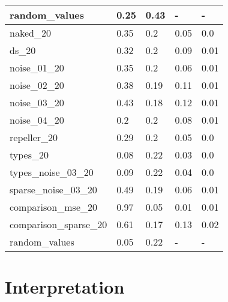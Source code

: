 \begin{table}[!htb]
\begin{tabularx}{\textwidth}{p{5cm} X X X X}
		random\_values & 0.25 & 0.43 & - & - \\
		\hline
		naked\_20 & 0.35 & 0.2 & 0.05 & 0.0 \\
		ds\_20 & 0.32 & 0.2 & 0.09 & 0.01 \\
		noise\_01\_20 & 0.35 & 0.2 & 0.06 & 0.01 \\
		noise\_02\_20 & 0.38 & 0.19 & 0.11 & 0.01 \\
		noise\_03\_20 & 0.43 & 0.18 & 0.12 & 0.01 \\
		noise\_04\_20 & 0.2 & 0.2 & 0.08 & 0.01 \\
		repeller\_20 & 0.29 & 0.2 & 0.05 & 0.0 \\
		types\_20 & 0.08 & 0.22 & 0.03 & 0.0 \\
		types\_noise\_03\_20 & 0.09 & 0.22 & 0.04 & 0.0 \\
		sparse\_noise\_03\_20 & 0.49 & 0.19 & 0.06 & 0.01 \\
		comparison\_mse\_20 & 0.97 & 0.05 & 0.01& 0.01 \\
		comparison\_sparse\_20 & 0.61 & 0.17& 0.13 & 0.02 \\
		random\_values & 0.05 & 0.22 & - & - \\
		\hline
	\end{tabularx}
	\label{table:comparison_all}
\end{table}

\section{Interpretation}

